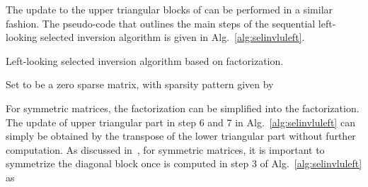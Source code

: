 \documentclass[10pt, conference, compsocconf,letterpaper,twocolumn]{IEEEtran}
\begin{document}
The update to the upper triangular blocks of  can be performed
in a similar fashion.
The pseudo-code that outlines the main steps of the sequential 
left-looking selected inversion algorithm is given 
in Alg.~\ref{alg:selinvluleft}.

\begin{algorithm}[h]
  \small
  \DontPrintSemicolon
  \caption{Left-looking selected inversion algorithm based on  factorization.}
  \label{alg:selinvluleft}




  Set  to be a zero sparse matrix, with sparsity pattern given
  by \;
\end{algorithm}

For symmetric matrices, the  factorization can be simplified into
the  factorization. The update of upper triangular part in step 6 and 7 in Alg.~\ref{alg:selinvluleft} can simply
be obtained by the transpose of the lower triangular part without
further computation. As discussed in~\cite{JacquelinLinYang2015}, for
symmetric matrices, it is important to symmetrize the diagonal block
once  is computed in step 3 of
Alg.~\ref{alg:selinvluleft} as
\end{document}

